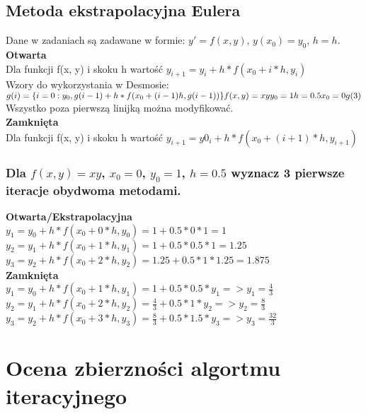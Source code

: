 \documentclass{article}
\begin{document}
\subsection{Metoda ekstrapolacyjna Eulera}
Dane w zadaniach są zadawane w formie: $y'=f(x, y)$, $y(x_0)=y_0$, $h=h$.\\
\textbf{Otwarta}\\
Dla funkcji f(x, y) i skoku h wartość $y_{i+1}=y_i+h*f(x_0+i*h, y_i)$\\
Wzory do wykorzystania w Desmosie:\\
$
g(i)=\{i=0:y_0,g(i-1)+h*f(x_0+(i-1)h, g(i-1))\}\\
f(x,y)=xy\\
y_0=1\\
h=0.5\\
x_0=0\\
g(3)\\
$\\
Wszystko poza pierwszą linijką można modyfikować.\\
\textbf{Zamknięta}\\
Dla funkcji f(x, y) i skoku h wartość $y_{i+1}=y0_i+h*f(x_0+(i+1)*h, y_{i+1})$\\

\subsubsection{Dla $f(x,y)=xy$, $x_0=0$, $y_0=1$, $h=0.5$ wyznacz 3 pierwsze iteracje obydwoma metodami.}
\textbf{Otwarta/Ekstrapolacyjna}\\
$y_1=y_0+h*f(x_0+0*h, y_0)=1+0.5*0*1=1$\\
$y_2=y_1+h*f(x_0+1*h, y_1)=1+0.5*0.5*1=1.25$\\
$y_3=y_2+h*f(x_0+2*h, y_2)=1.25+0.5*1*1.25=1.875$\\
\textbf{Zamknięta}\\
$y_1=y_0+h*f(x_0+1*h, y_1)=1+0.5*0.5*y_1 => y_1=\frac{4}{3}$\\
$y_2=y_1+h*f(x_0+2*h, y_2)=\frac{4}{3}+0.5*1*y_2 => y_2=\frac{8}{3}$\\
$y_3=y_2+h*f(x_0+3*h, y_3)=\frac{8}{3}+0.5*1.5*y_3 => y_3=\frac{32}{3}$\\

\section{Ocena zbierzności algortmu iteracyjnego}
\end{document}
